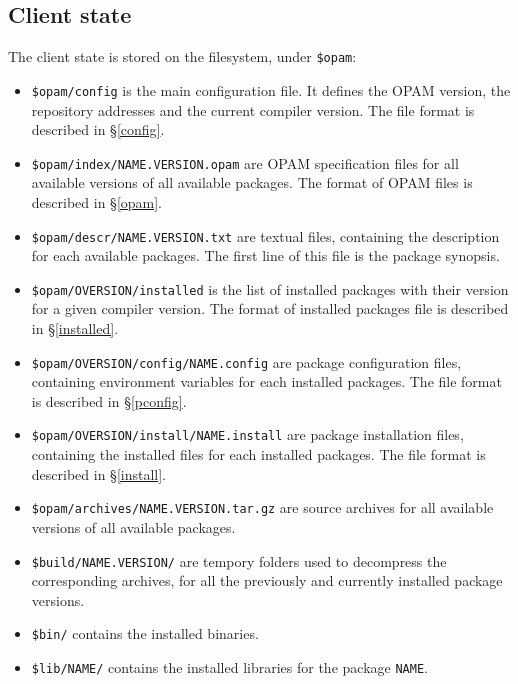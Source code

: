 \documentclass[a4paper,11pt]{article}
\begin{document}
\subsection{Client state}
\label{client}

The client state is stored on the filesystem, under {\tt \$opam}:

\begin{itemize}

\item {\tt \$opam/config} is the main configuration file. It defines
  the OPAM version, the repository addresses and the current compiler
  version. The file format is described in \S\ref{config}.

\item {\tt \$opam/index/NAME.VERSION.opam} are OPAM specification
  files for all available versions of all available packages. The
  format of OPAM files is described in \S\ref{opam}.

\item {\tt \$opam/descr/NAME.VERSION.txt} are textual files,
  containing the description for each available packages. The first
  line of this file is the package synopsis.

\item {\tt \$opam/OVERSION/installed} is the list of installed
  packages with their version for a given compiler version. The format
  of installed packages file is described in \S\ref{installed}.

\item {\tt \$opam/OVERSION/config/NAME.config} are package configuration
  files, containing environment variables for each installed
  packages. The file format is described in \S\ref{pconfig}.

\item {\tt \$opam/OVERSION/install/NAME.install} are package installation
  files, containing the installed files for each installed
  packages. The file format is described in \S\ref{install}.

\item {\tt \$opam/archives/NAME.VERSION.tar.gz} are source archives
  for all available versions of all available packages.

\item {\tt \$build/NAME.VERSION/} are tempory folders used to
  decompress the corresponding archives, for all the previously and
  currently installed package versions.

\item {\tt \$bin/} contains the installed binaries.

\item {\tt \$lib/NAME/} contains the installed libraries for the
  package {\tt NAME}.

\end{itemize}
\end{document}
